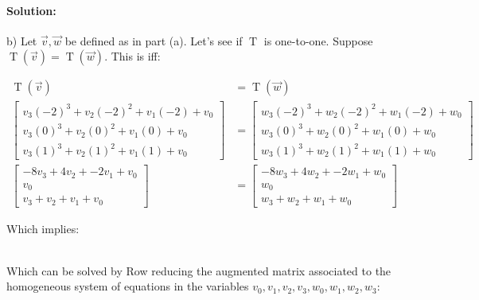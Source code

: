 \documentclass[12pt, letterpaper]{article}
\theoremstyle{statement}
\theoremstyle{statement}
\newenvironment{Solution}{\noindent\ignorespaces\paragraph{Solution:}}{\hfill \ding{122}\par\noindent}
\begin{document}
\begin{Solution}
    
    b) Let $\Vec{v}, \Vec{w}$ be defined as in part (a). Let's see if $\operatorname{T}$ is one-to-one. Suppose $\operatorname{T}(\Vec{v})=\operatorname{T}(\Vec{w})$. This is iff: 

    \begin{align*}
        \operatorname{T}(\Vec{v}) &= \operatorname{T}(\Vec{w}) \\
        \begin{bmatrix}
        v_3(-2)^3 + v_2(-2)^2 + v_1(-2) + v_0 \\
        v_3(0)^3 + v_2(0)^2 + v_1(0) + v_0 \\
        v_3(1)^3 + v_2(1)^2 + v_1(1) + v_0
        \end{bmatrix}
        &= 
        \begin{bmatrix}
        w_3(-2)^3 + w_2(-2)^2 + w_1(-2) + w_0 \\
        w_3(0)^3 + w_2(0)^2 + w_1(0) + w_0 \\
        w_3(1)^3 + w_2(1)^2 + w_1(1) + w_0
        \end{bmatrix}
        \\
        \begin{bmatrix}
        -8v_3 + 4v_2 + -2v_1 + v_0 \\
        v_0 \\
        v_3 + v_2 + v_1 + v_0
        \end{bmatrix}
        &= 
        \begin{bmatrix}
        -8w_3 + 4w_2 + -2w_1 + w_0 \\
        w_0 \\
        w_3 + w_2 + w_1 + w_0
        \end{bmatrix}
    \end{align*}
    
    Which implies: 
    
    \\
    
    
    Which can be solved by Row reducing the augmented matrix associated to the homogeneous system of equations in the variables $v_0, v_1, v_2, v_3, w_0, w_1, w_2, w_3$:
    

\end{Solution}
\end{document}
